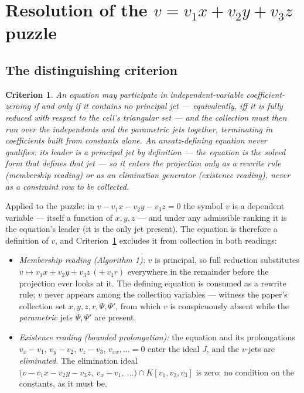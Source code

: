 \documentclass[11pt]{article}
\newcommand{\Psib}{\Psi}
\newtheorem{criterion}{Criterion}
\begin{document}
\section{Resolution of the $v = v_1x+v_2y+v_3z$ puzzle}
\label{sec:puzzle}

\subsection{The distinguishing criterion}

\begin{criterion}
\label{crit:main}
An equation may participate in independent-variable coefficient-zeroing if
and only if it contains \emph{no principal jet} --- equivalently, iff it is
fully reduced with respect to the cell's triangular set --- and the collection
must then run over the independents \emph{and} the parametric jets together,
terminating in coefficients built from constants alone. An ansatz-defining
equation never qualifies: its leader is a principal jet \emph{by
definition} --- the equation is the solved form that \emph{defines} that jet
--- so it enters the projection only as a rewrite rule (membership reading)
or as an elimination generator (existence reading), never as a constraint row
to be collected.
\end{criterion}

Applied to the puzzle: in $v - v_1x - v_2y - v_3z = 0$ the symbol $v$ is a
dependent variable --- itself a function of $x,y,z$ --- and under any
admissible ranking it is the equation's leader (it is the only jet present).
The equation is therefore a definition of $v$, and Criterion~\ref{crit:main}
excludes it from collection in both readings:

\begin{itemize}
\item \emph{Membership reading (Algorithm 1):} $v$ is principal, so full
  reduction substitutes $v \mapsto v_1x+v_2y+v_3z\,(+\,v_4r)$ everywhere in
  the remainder before the projection ever looks at it. The defining equation
  is consumed as a rewrite rule; $v$ never appears among the collection
  variables --- witness the paper's collection set $x,y,z,r,\Psib,\Psib'$,
  from which $v$ is conspicuously absent while the \emph{parametric} jets
  $\Psib,\Psib'$ are present.
\item \emph{Existence reading (bounded prolongation):} the equation and its
  prolongations $v_x - v_1$, $v_y - v_2$, $v_z - v_3$, $v_{xx}, \dots = 0$
  enter the ideal $J$, and the $v$-jets are \emph{eliminated}. The elimination
  ideal $\bigl(v - v_1x - v_2y - v_3z,\ v_x-v_1,\ \dots\bigr) \cap
  K[v_1,v_2,v_3]$ is zero: no condition on the constants, as it must be.
\end{itemize}
\end{document}
